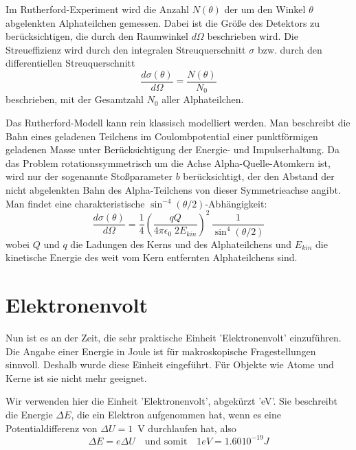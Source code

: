 Im Rutherford-Experiment wird die Anzahl $N(\theta)$ der um den Winkel $\theta$ abgelenkten Alphateilchen gemessen. Dabei ist die Größe des Detektors zu berücksichtigen, die durch den Raumwinkel $d\Omega$ beschrieben wird. Die Streueffizienz wird durch den integralen Streuquerschnitt $\sigma$ bzw. durch den differentiellen Streuquerschnitt  
\begin{equation}
    \frac{d \sigma(\theta)}{d\Omega} = \frac{N(\theta)}{N_0}
\end{equation}
beschrieben, mit der Gesamtzahl $N_0$ aller Alphateilchen.

Das Rutherford-Modell kann rein klassisch modelliert werden. Man beschreibt die Bahn eines geladenen Teilchens im Coulombpotential einer punktförmigen geladenen Masse unter Berücksichtigung der Energie- und Impulserhaltung. Da das Problem rotationssymmetrisch um die Achse Alpha-Quelle-Atomkern ist, wird nur der sogenannte Stoßparameter $b$ berücksichtigt, der den Abstand der nicht abgelenkten Bahn des Alpha-Teilchens von dieser Symmetrieachse angibt. Man findet  eine charakteristische $\sin^{-4} (\theta/2)$-Abhängigkeit:
\begin{equation}
    \frac{d \sigma(\theta)}{d\Omega} =
    \frac{1}{4} \left(
\frac{qQ}{4 \pi \epsilon_0 \; 2 E_{kin}}
    \right)^2 \, \frac{1}{\sin^4 (\theta/2)}
\end{equation}
wobei $Q$ und $q$ die Ladungen des Kerns und des Alphateilchens und $E_{kin}$ die kinetische Energie des weit vom Kern entfernten Alphateilchens sind.


\section{Elektronenvolt}

Nun ist es an der Zeit, die sehr praktische Einheit 'Elektronenvolt' einzuführen. Die Angabe einer Energie in Joule ist für makroskopische Fragestellungen sinnvoll. Deshalb wurde diese Einheit eingeführt. Für Objekte wie Atome und Kerne ist sie nicht mehr geeignet. 

Wir verwenden hier die Einheit 'Elektronenvolt', abgekürzt 'eV'. Sie beschreibt die Energie $\Delta E$, die ein Elektron aufgenommen hat, wenn es eine Potentialdifferenz von $\Delta U =1$~V durchlaufen hat, also 
\begin{equation}
    \Delta E = e \Delta U \quad \text{und somit} \quad \si{1}{eV} = \si{1.60 10^{-19}}{J}
\end{equation}

